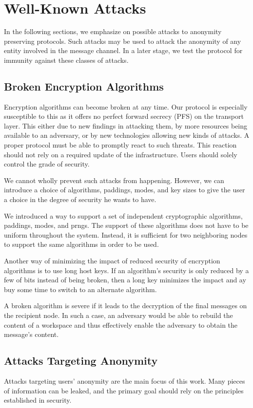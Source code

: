 \section{Well-Known Attacks}\label{sec:wellKnownAttacks}
In the following sections, we emphasize on possible attacks to anonymity preserving protocols. Such attacks may be used to attack the anonymity of any entity involved in the message channel. In a later stage, we test the protocol for immunity against these classes of attacks.

\subsection{Broken Encryption Algorithms}
Encryption algorithms can become broken at any time. Our protocol is especially susceptible to this as it offers no perfect forward secrecy (PFS) on the transport layer. This either due to new findings in attacking them, by more resources being available to an adversary, or by new technologies allowing new kinds of attacks. A proper protocol must be able to promptly react to such threats. This reaction should not rely on a required update of the infrastructure. Users should solely control the grade of security. 

We cannot wholly prevent such attacks from happening. However, we can introduce a choice of algorithms, paddings, modes, and key sizes to give the user a choice in the degree of security he wants to have.

We introduced a way to support a set of independent cryptographic algorithms, paddings, modes, and prngs. The support of these algorithms does not have to be uniform throughout the system. Instead, it is sufficient for two neighboring nodes to support the same algorithms in order to be used. 

Another way of minimizing the impact of reduced security of encryption algorithms is to use long host keys. If an algorithm's security is only reduced by a few of bits instead of being broken, then a long key minimizes the impact and ay buy some time to switch to an alternate algorithm. 

A broken algorithm is severe if it leads to the decryption of the final messages on the recipient node. In such a case, an adversary would be able to rebuild the content of a workspace and thus effectively enable the adversary to obtain the message's content.

\subsection{Attacks Targeting Anonymity}
Attacks targeting users' anonymity are the main focus of this work. Many pieces of information can be leaked, and the primary goal should rely on the principles established in security.

